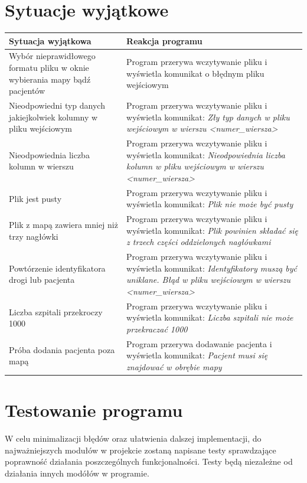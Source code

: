 \documentclass{article}
\begin{document}
\section{Sytuacje wyjątkowe}
\begin{table}[!h]
    \centering
    \begin{tabular}{|p{6cm}|p{6cm}|}
        \hline
         Sytuacja wyjątkowa & Reakcja programu \\ \hline
         Wybór nieprawidłowego formatu pliku w oknie wybierania mapy bądź pacjentów & Program przerywa wczytywanie pliku i wyświetla komunikat o błędnym pliku wejściowym \\ \hline
         Nieodpowiedni typ danych jakiejkolwiek kolumny w pliku wejściowym & Program przerywa wczytywanie pliku i wyświetla komunikat: \emph{Zły typ danych w pliku wejściowym w wierszu <numer\_wiersza>} \\ \hline
         Nieodpowiednia liczba kolumn w wierszu & Program przerywa wczytywanie pliku i wyświetla komunikat: \emph{Nieodpowiednia liczba kolumn w pliku wejściowym w wierszu <numer\_wiersza>} \\ \hline
         Plik jest pusty & Program przerywa wczytywanie pliku i wyświetla komunikat: \emph{Plik nie może być pusty} \\ \hline
         Plik z mapą zawiera mniej niż trzy nagłówki & Program przerywa wczytywanie pliku i wyświetla komunikat: \emph{Plik powinien składać się z trzech części oddzielonych nagłówkami} \\ \hline
         Powtórzenie identyfikatora drogi lub pacjenta & Program przerywa wczytywanie pliku i wyświetla komunikat: \emph{Identyfikatory muszą być uniklane. Błąd w pliku wejściowym w wierszu <numer\_wiersza>} \\ \hline
         Liczba szpitali przekroczy 1000 & Program przerywa wczytywanie pliku i wyświetla komunikat: \emph{Liczba szpitali nie może przekraczać 1000} \\ \hline
         Próba dodania pacjenta poza mapą & Program przerywa dodawanie pacjenta i wyświetla komunikat: \emph{Pacjent musi się znajdować w obrębie mapy} \\ \hline
    \end{tabular}
\end{table}

\section{Testowanie programu}
{\fontsize{14}{14}\selectfont
W celu minimalizacji błędów oraz ułatwienia dalszej implementacji, do najważniejszych modułów w projekcie zostaną napisane testy sprawdzające poprawność działania poszczególnych funkcjonalności.
Testy będą niezależne od działania innych modółów w programie.}
\end{document}

